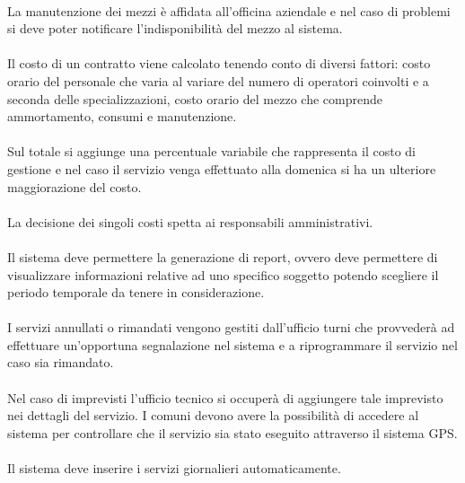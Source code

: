 \documentclass[green, fancy, 11pt]{elegantbook}
\begin{document}
\\
La manutenzione dei mezzi è affidata all’officina aziendale e nel caso di problemi si deve poter notificare l’indisponibilità del mezzo al sistema.\\
\\
Il costo di un contratto viene calcolato tenendo conto di diversi fattori: costo orario del personale che varia al variare del numero di operatori coinvolti e a seconda delle specializzazioni, costo orario del mezzo che comprende ammortamento, consumi e manutenzione.\\
\\
Sul totale si aggiunge una percentuale variabile che rappresenta il costo di gestione e nel caso il servizio venga effettuato alla domenica si ha un ulteriore maggiorazione del costo.\\
\\
La decisione dei singoli costi spetta ai responsabili amministrativi.\\
\\
Il sistema deve permettere la generazione di report, ovvero deve permettere di visualizzare informazioni relative ad uno specifico soggetto potendo scegliere il periodo temporale da tenere in considerazione.\\
\\
I servizi annullati o rimandati vengono gestiti dall’ufficio turni che provvederà ad effettuare un’opportuna segnalazione nel sistema e a riprogrammare il servizio nel caso sia rimandato.\\
\\
Nel caso di imprevisti l’ufficio tecnico si occuperà di aggiungere tale imprevisto nei dettagli del servizio.
I comuni devono avere la possibilità di accedere al sistema per controllare che il servizio sia stato eseguito attraverso il sistema GPS.\\
\\
Il sistema deve inserire i servizi giornalieri automaticamente.
\end{document}
